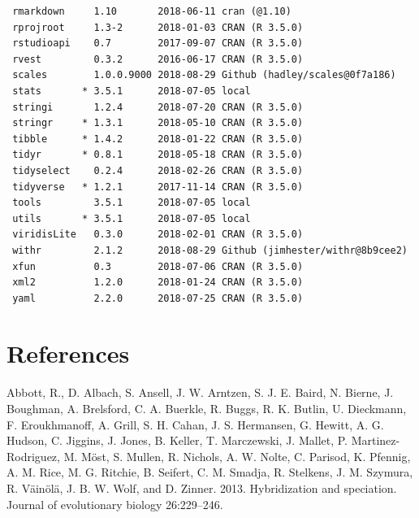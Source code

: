 \documentclass[twoside,12pt,final]{ucthesis-CA2012} %
\begin{document}
\begin{ucmainmatter}
\begin{verbatim}
 rmarkdown     1.10       2018-06-11 cran (@1.10)                         
 rprojroot     1.3-2      2018-01-03 CRAN (R 3.5.0)                       
 rstudioapi    0.7        2017-09-07 CRAN (R 3.5.0)                       
 rvest         0.3.2      2016-06-17 CRAN (R 3.5.0)                       
 scales        1.0.0.9000 2018-08-29 Github (hadley/scales@0f7a186)       
 stats       * 3.5.1      2018-07-05 local                                
 stringi       1.2.4      2018-07-20 CRAN (R 3.5.0)                       
 stringr     * 1.3.1      2018-05-10 CRAN (R 3.5.0)                       
 tibble      * 1.4.2      2018-01-22 CRAN (R 3.5.0)                       
 tidyr       * 0.8.1      2018-05-18 CRAN (R 3.5.0)                       
 tidyselect    0.2.4      2018-02-26 CRAN (R 3.5.0)                       
 tidyverse   * 1.2.1      2017-11-14 CRAN (R 3.5.0)                       
 tools         3.5.1      2018-07-05 local                                
 utils       * 3.5.1      2018-07-05 local                                
 viridisLite   0.3.0      2018-02-01 CRAN (R 3.5.0)                       
 withr         2.1.2      2018-08-29 Github (jimhester/withr@8b9cee2)     
 xfun          0.3        2018-07-06 CRAN (R 3.5.0)                       
 xml2          1.2.0      2018-01-24 CRAN (R 3.5.0)                       
 yaml          2.2.0      2018-07-25 CRAN (R 3.5.0)                       
\end{verbatim}
\backmatter

\hypertarget{references}{%
\chapter*{References}\label{references}}


\noindent

\setlength{\parindent}{-0.20in}
\setlength{\leftskip}{0.20in}
\setlength{\parskip}{8pt}

\hypertarget{refs}{}
\leavevmode\hypertarget{ref-abbott_hybridization_2013}{}%
Abbott, R., D. Albach, S. Ansell, J. W. Arntzen, S. J. E. Baird, N.
Bierne, J. Boughman, A. Brelsford, C. A. Buerkle, R. Buggs, R. K.
Butlin, U. Dieckmann, F. Eroukhmanoff, A. Grill, S. H. Cahan, J. S.
Hermansen, G. Hewitt, A. G. Hudson, C. Jiggins, J. Jones, B. Keller, T.
Marczewski, J. Mallet, P. Martinez-Rodriguez, M. Möst, S. Mullen, R.
Nichols, A. W. Nolte, C. Parisod, K. Pfennig, A. M. Rice, M. G. Ritchie,
B. Seifert, C. M. Smadja, R. Stelkens, J. M. Szymura, R. Väinölä, J. B.
W. Wolf, and D. Zinner. 2013. Hybridization and speciation. Journal of
evolutionary biology 26:229--246.


\end{ucmainmatter}
\end{document}

